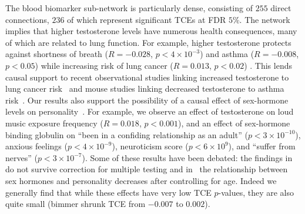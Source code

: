 \documentclass{article}
\begin{document}
The blood biomarker sub-network is particularly dense,
consisting of $255$ direct connections, $236$ of which represent
significant TCEs at FDR $5\%$.
The network implies that higher testosterone levels have numerous health consequences, many of
which are related to lung function. For example, higher testosterone protects against
shortness of breath ($R = -0.028$, $p < 4\times 10^{-3}$) and asthma ($R = -0.008$, $p < 0.05$)
while increasing risk of lung cancer ($R = 0.013$, $p < 0.02$) . This lends causal support to
recent observational studies linking increased testosterone to lung cancer risk~\cite{Hyde2012}
and mouse studies linking decreased testosterone to asthma risk~\cite{Cephus2017}.
Our results also support the possibility of a causal effect of sex-hormone
levels on personality~\cite{Colangelo2012,Asselmann2019,Ekholm2014,Aluja2014}.
For example, we observe an effect of testosterone on loud
music exposure frequency ($R = 0.018$, $p < 0.001$), and
an effect of sex-hormone binding globulin on
``been in a confiding relationship as an adult'' ($p < 3 \times 10^{-10}$),
 anxious feelings ($p<4\times 10^{-9}$), neuroticism score ($p<6\times 10^{9}$), and ``suffer from nerves''
($p < 3\times 10^{-7}$). Some of these results have been debated: the findings in~\cite{Asselmann2019} do not survive correction for multiple testing and
in~\cite{Aluja2014} the relationship between sex hormones and personality decreases after controlling
for age. Indeed we generally find that while these effects have very low TCE $p$-values, they 
are also quite small (bimmer shrunk TCE from $-0.007$ to $0.002$).
\end{document}
